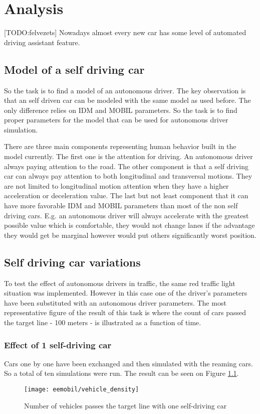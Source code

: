 \chapter{Analysis}
	[TODO:felvezets]
	Nowadays almost every new car has some level of automated driving assistant feature.
	\section{Model of a self driving car}
		So the task is to find a model of an autonomous driver. The key observation is that an self driven car can be modeled with the same model as used before. The only difference relies on IDM and MOBIL parameters. So the task is to find proper parameters for the model that can be used for autonomous driver simulation.
	
		There are three main components representing human behavior built in the model currently. The first one is the attention for driving. An autonomous driver always paying attention to the road. The other component is that a self driving car can always pay attention to both longitudinal and transversal motions. They are not limited to longitudinal motion attention when they have a higher acceleration or deceleration value. The last but not least component that it can have more favorable IDM and MOBIL parameters than most of the non self driving cars. E.g. an autonomous driver will always accelerate with the greatest possible value which is comfortable, they would not change lanes if the advantage they would get be marginal however would put others significantly worst position.
	\section{Self driving car variations}
		To test the effect of autonomous drivers in traffic, the same red traffic light situation was implemented. However in this case one of the driver's parameters have been substituted with an autonomous driver parameters. The most representative figure of the result of this task is where the count of cars passed the target line - 100 meters - is illustrated as a function of time. 
		\subsection{Effect of 1 self-driving car}
		Cars one by one have been exchanged and then simulated with the reaming cars. So a total of ten simulations were run. The result can be seen on Figure \ref{fig:vehicle_density}.
		\begin{figure}
			\centering
			\texttt{[image: eemobil/vehicle\_density]}
			\caption{Number of vehicles passes the target line with one self-driving car}
			\label{fig:vehicle_density}
		\end{figure}

